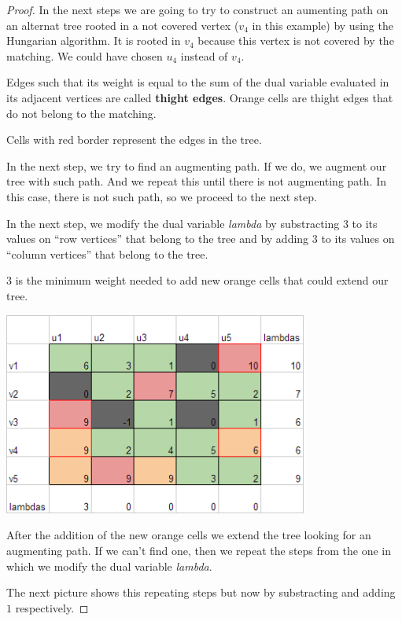 \begin{proof}
    In the next steps we are going to try to construct an aumenting path on
    an alternat tree rooted in a not covered vertex ($v_4$ in this example) by using
    the Hungarian algorithm. It is rooted in $v_4$ because this vertex is not covered by the
    matching. We could have chosen $u_4$ instead of $v_4$.\pn
    
    Edges such that its weight is equal to the sum of the dual variable evaluated in 
    its adjacent vertices are called \textbf{thight edges}. Orange cells are thight edges
    that do not belong to the matching.
    
    Cells with red border represent the edges in the tree.\pn
    
    In the next step, we try to find an augmenting path. If we do, we augment our
    tree with such path. And we repeat this until there is not augmenting path. In
    this case, there is not such path, so we proceed to the next step.
    
    In the next step, we modify the dual variable \textit{lambda} by substracting
    $3$ to its values on ``row vertices'' that belong to the tree and by adding
    $3$ to its values on ``column vertices'' that belong to the tree.\pn
    
    $3$ is the minimum weight needed to add new orange cells that could extend
    our tree.\pn
   
    \begin{center}
        \includegraphics[width=10cm]{OptimalAssignmentExample/OptimalAssignment3.png}
    \end{center}\pn

    After the addition of the new orange cells we extend the tree looking for an
    augmenting path. If we can't find one, then we repeat the steps from the one
    in which we modify the dual variable \textit{lambda}. 
    
    The next picture shows this repeating steps but now by substracting and adding $1$
    respectively.


\end{proof}

